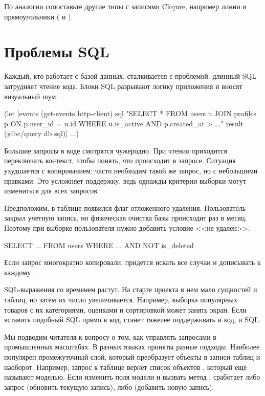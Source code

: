 По аналогии сопоставьте другие типы с записями Clojure, например линии и прямоугольники ( и ).

\section{Проблемы SQL}

Каждый, кто работает с базой данных, сталкивается с проблемой: длинный SQL затрудняет чтение кода. Блоки SQL разрывают логику приложения и вносят визуальный шум.

\begin{english}
  \begin{clojure}
(let [events (get-events http-client)
      sql "SELECT * FROM users u
JOIN profiles p ON p.user_id = u.id
WHERE u.is_active
AND p.created_at > ..."
      result (jdbc/query db sql)]
  ...)
  \end{clojure}
\end{english}

Большие запросы в коде смотрятся чужеродно. При чтении приходится переключать контекст, чтобы понять, что происходит в запросе. Ситуация ухудшается с копированием: часто необходим такой же запрос, но с небольшими правками. Это усложняет поддержку, ведь однажды критерии выборки могут измениться для всех запросов.

Предположим, в таблице появился флаг отложенного удаления. Пользователь закрыл учетную запись, но физическая очистка базы происходит раз в месяц. Поэтому при выборке пользователя нужно добавить условие <<не удален>>:

\begin{english}
  \begin{clojure}
SELECT ... FROM users WHERE ... AND NOT is_deleted
  \end{clojure}
\end{english}

Если запрос многократно копировали, придется искать все случаи и дописывать к каждому .

SQL-выражения со временем растут. На старте проекта в нем мало сущностей и таблиц, но затем их число увеличивается. Например, выборка популярных товаров с их категориями, оценками и сортировкой может занять экран. Если вставить подобный SQL прямо в код, станет тяжелее поддерживать и код, и SQL.

Мы подводим читателя к вопросу о том, как управлять запросами в промышленных масштабах. В разных языках приняты разные подходы. Наиболее популярен промежуточный слой, который преобразует объекты в записи таблиц и наоборот. Например, запрос к таблице  вернёт список объектов , который ещё называют моделью. Если изменить поля модели и вызвать метод , сработает либо запрос  (обновить текущую запись), либо  (добавить новую запись).

